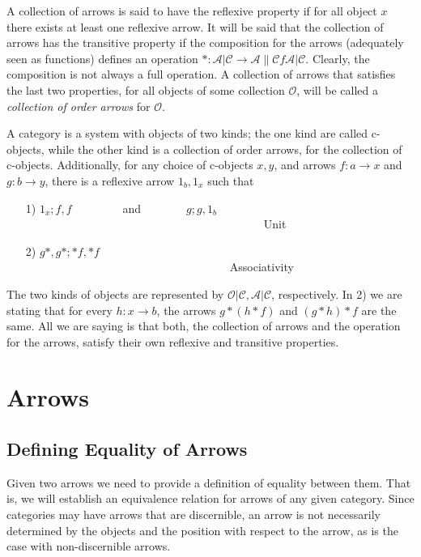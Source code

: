 \documentclass [12pt]{book}
\begin{document}
A collection of arrows is said to have the reflexive property if for all object $x$ there exists at least one reflexive arrow. It will be said that the collection of arrows has the transitive property if the composition for the arrows (adequately seen as functions) defines an operation $*:\mathcal{A|C}\rightarrow\mathcal{A\|C}f\mathcal{A|C}$. Clearly, the composition is not always a full operation. A collection of arrows that satisfies the last two properties, for all objects of some collection $\mathcal{O}$, will be called a \textit{collection of order arrows} for $\mathcal{O}$.

\begin{definition}A category is a system with objects of two kinds; the one kind are called c-objects, while the other kind is a collection of order arrows, for the collection of c-objects. Additionally, for any choice of c-objects $x,y$, and arrows $f:a\rightarrow x$ and $g:b\rightarrow y$, there is a reflexive arrow $1_{b},1_x$ such that \begin{itemize}\item[1)] $1_{x};f,f$~~~~~~~~~and~~~~~~~~$g;g,1_{b}$~~~~~~~~~~~~~~~~~~~~~
~~~~~~~~~~~~~~~~~~~~~~~~~~~~~~~~~~~~~~~~~~Unit\item[2)] $g*,g*;*f,*f$~~~~~~~~~~~~~~~~~~~~~~~~~~~~~~~~~~~~~~~~~~~~~~~~~~~~
~~~~~~~~~~~~~~~~~~~~~~~~~~~~~~~~~~~~Associativity\end{itemize}\end{definition}

The two kinds of objects are represented by $\mathcal{O|C},\mathcal{A|C}$, respectively. In 2) we are stating that for every $h:x\rightarrow b$, the arrows $g*(h*f)$ and $(g*h)*f$ are the same. All we are saying is that both, the collection of arrows and the operation for the arrows, satisfy their own reflexive and transitive properties.

	\section{Arrows}

		\subsection{Defining Equality of Arrows} 

Given two arrows we need to provide a definition of equality between them. That is, we will establish an equivalence relation for arrows of any given category. Since categories may have arrows that are discernible, an arrow is not necessarily determined by the objects and the position with respect to the arrow, as is the case with non-discernible arrows. 
\end{document}

